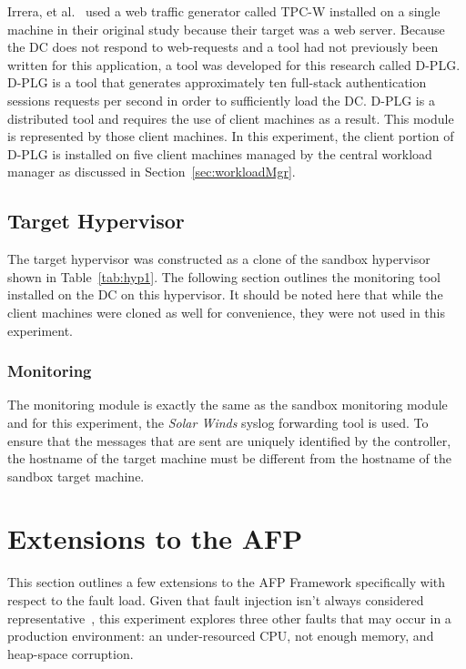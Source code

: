 Irrera, et al.~\cite{irrera2015} used a web traffic generator called TPC-W
installed on a single machine in their original study because their target was
a web server.  Because the \ac{DC} does not respond to web-requests and a tool
had not previously been written for this application, a tool was developed for
this research called \ac{D-PLG}. \ac{D-PLG} is a tool that generates
approximately ten full-stack authentication sessions requests per second in
order to sufficiently load the \ac{DC}.  \ac{D-PLG} is a distributed tool and
requires the use of client machines as a result.  This module is represented by
those client machines.  In this experiment, the client portion of \ac{D-PLG} is
installed on five client machines managed by the central workload manager as
discussed in Section~\ref{sec:workloadMgr}.

\subsection{Target Hypervisor} \label{sec:target}
The target hypervisor was constructed as a clone of the sandbox hypervisor
shown in Table~\ref{tab:hyp1}.  The following section outlines the monitoring
tool installed on the \ac{DC} on this hypervisor.  It should be noted here that
while the client machines were cloned as well for convenience, they were not
used in this experiment.

\subsubsection{Monitoring} \label{sec:targetMonitoringTool}
The monitoring module is exactly the same as the sandbox monitoring module and
for this experiment, the \emph{Solar Winds} syslog forwarding tool is used.  To
ensure that the messages that are sent are uniquely identified by the
controller, the hostname of the target machine must be different from the
hostname of the sandbox target machine.

\setcounter{secnumdepth}{3}

\section{Extensions to the \ac{AFP}} \label{sec:extensions}
This section outlines a few extensions to the \ac{AFP} Framework specifically
with respect to the fault load.  Given that fault injection isn't always
considered representative~\cite{kikuchi2014}, this experiment explores three
other faults that may occur in a production environment:  an under-resourced
\ac{CPU}, not enough memory, and heap-space corruption.


